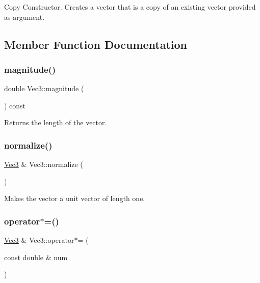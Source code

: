 Copy Constructor. Creates a vector that is a copy of an existing vector provided as argument. 

\subsection{Member Function Documentation}
\mbox{\label{classVec3_adfb6f8c3015191ddde74770e1c873e47}} 
\subsubsection{\texorpdfstring{magnitude()}{magnitude()}}
{\footnotesize\ttfamily double Vec3\+::magnitude (\begin{DoxyParamCaption}{ }\end{DoxyParamCaption}) const}



Returns the length of the vector. 

\mbox{\label{classVec3_a178adc51fcda1b1e2acb50fffb8d3a96}} 
\subsubsection{\texorpdfstring{normalize()}{normalize()}}
{\footnotesize\ttfamily \mbox{\hyperlink{classVec3}{Vec3}} \& Vec3\+::normalize (\begin{DoxyParamCaption}{ }\end{DoxyParamCaption})}



Makes the vector a unit vector of length one. 

\mbox{\label{classVec3_a95bcd936b220a060e801e7ae44714adf}} 
\subsubsection{\texorpdfstring{operator$\ast$=()}{operator*=()}}
{\footnotesize\ttfamily \mbox{\hyperlink{classVec3}{Vec3}} \& Vec3\+::operator$\ast$= (\begin{DoxyParamCaption}\item[{const double \&}]{num }\end{DoxyParamCaption})}



